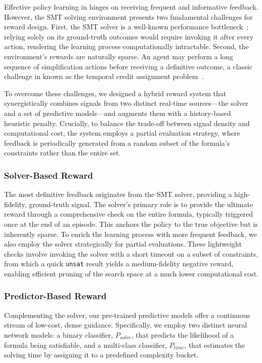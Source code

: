 Effective policy learning in \RL{} hinges on receiving frequent and informative feedback. However, the SMT solving environment presents two fundamental challenges for reward design. First, the SMT solver is a well-known performance bottleneck~\cite{cadar2013symbolic}; relying solely on its ground-truth outcomes would require invoking it after every action, rendering the learning process computationally intractable. Second, the environment's rewards are naturally sparse. An agent may perform a long sequence of simplification actions before receiving a definitive outcome, a classic challenge in \RL{} known as the temporal credit assignment problem~\cite{sutton2018reinforcement}.

To overcome these challenges, we designed a hybrid reward system that synergistically combines signals from two distinct real-time sources---the solver and a set of predictive models---and augments them with a history-based heuristic penalty. Crucially, to balance the trade-off between signal density and computational cost, the system employs a partial evaluation strategy, where feedback is periodically generated from a random subset of the formula's constraints rather than the entire set.

\subsubsection{Solver-Based Reward}
The most definitive feedback originates from the SMT solver, providing a high-fidelity, ground-truth signal. The solver's primary role is to provide the ultimate reward through a comprehensive check on the entire formula, typically triggered once at the end of an episode. This anchors the policy to the true objective but is inherently sparse. To enrich the learning process with more frequent feedback, we also employ the solver strategically for partial evaluations. These lightweight checks involve invoking the solver with a short timeout on a subset of constraints, from which a quick \texttt{unsat} result yields a medium-fidelity negative reward, enabling efficient pruning of the search space at a much lower computational cost.

\subsubsection{Predictor-Based Reward}
Complementing the solver, our pre-trained predictive models offer a continuous stream of low-cost, dense guidance. Specifically, we employ two distinct neural network models: a binary classifier, $P_{solve}$, that predicts the likelihood of a formula being satisfiable, and a multi-class classifier, $P_{time}$, that estimates the solving time by assigning it to a predefined complexity bucket.


